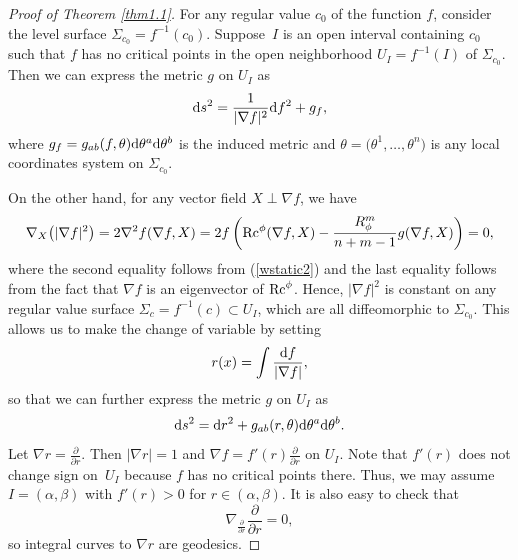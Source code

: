 \documentclass[pdftex]{sigma}
\numberwithin{equation}{section}
\begin{document}
\begin{proof}[Proof of Theorem \ref{thm1.1}]
For any regular value $c_0$ of the function $f$, consider the level surface $\Sigma_{c_0}=f^{-1}(c_0)$. Suppose~$I$ is an open interval containing $c_0$ such that $f$ has no critical points in the open neighborhood $U_I=f^{-1}(I)$ of $\Sigma_{c_0}$. Then we can express the metric $g$ on $U_I$ as
\begin{equation*}
 {\rm d}s^2=\frac{1}{|\nabla f|^2}{\rm d}f^2+g_{f},
\end{equation*}
where $g_{f}=g_{ab}(f,\theta){\rm d}\theta^a{\rm d}\theta^b$ is the induced metric and $\theta=\bigl(\theta^1,\dots,\theta^n\bigr)$ is any local coordinates system on $\Sigma_{c_0}$.

On the other hand, for any vector field $X\perp \nabla f$, we have
\begin{equation*}
 \nabla_X\bigl(|\nabla f|^2\bigr)=2\nabla^2f(\nabla f,X)=2f\left({\rm Rc}^\phi(\nabla f,X)-\frac{R_\phi^m}{n+m-1}g(\nabla f,X)\right)=0,
\end{equation*}
where the second equality follows from (\ref{wstatic2})
and the last equality follows from the fact that $\nabla f$ is an eigenvector of ${\rm Rc}^\phi$. Hence, $|\nabla f|^2$ is constant on any regular value surface $\Sigma_c=f^{-1}(c)\subset U_I$, which are all diffeomorphic to $\Sigma_{c_0}$. This allows us to make the change of variable by setting
\begin{equation*}
 r(x)=\int \frac{{\rm d}f}{|\nabla f|},
\end{equation*}
so that we can further express the metric $g$ on $U_I$ as
\begin{equation*}
 {\rm d}s^2={\rm d}r^2+g_{ab}(r,\theta){\rm d}\theta^a{\rm d}\theta^b.
\end{equation*}
Let $\nabla r=\frac{\partial}{\partial r}$. Then $|\nabla r|=1$ and $\nabla f=f'(r) \frac{\partial }{\partial r}$ on $U_I$. Note that $f'(r)$ does not change sign on~$U_I$ because $f$ has no critical points there. Thus, we may assume $I=(\alpha,\beta)$ with $f'(r)>0$ for $r\in (\alpha,\beta)$. It is also easy to check that
\begin{equation}\label{cao2.4}
 \nabla_{\frac{\partial}{\partial r}}\frac{\partial}{\partial r}=0,
\end{equation}
so integral curves to $\nabla r$ are geodesics.


\end{proof}
\end{document}
